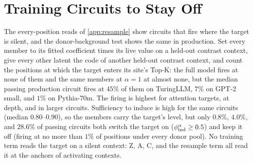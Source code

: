 \documentclass[10pt]{article}
\begin{document}


\section{Training Circuits to Stay Off}
\label{app:off-term}

The every-position reads of \cref{app:resample} show circuits that fire where the target is silent, and the donor-background test shows the same in production.
Set every member to its fitted coefficient times its live value on a held-out contrast context, give every other latent the code of another held-out contrast context, and count the positions at which the target enters its site's Top-K: the full model fires at none of them and the same members at $\alpha = 1$ at almost none, but the median passing production circuit fires at $45\%$ of them on TuringLLM, $7\%$ on GPT-2 small, and $1\%$ on Pythia-70m.
The firing is highest for attention targets, at depth, and in larger circuits.
Sufficiency to induce is high for the same circuits (median $0.80$--$0.90$), so the members carry the target's level, but only $0.8\%$, $4.0\%$, and $28.6\%$ of passing circuits both switch the target on ($\phi_{\mathrm{ind}}^{\alpha} \ge 0.5$) and keep it off (firing at no more than $1\%$ of positions under every donor pool).
No training term reads the target on a silent context: Z, A, C, and the resample term all read it at the anchors of activating contexts.
\end{document}

